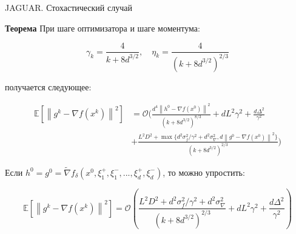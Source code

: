 \documentclass{beamer}
\newcommand{\expect}[1]{\mathbb{E}\left[ #1 \right]}
\newcommand{\norms}[1]{\left\| #1 \right\|}
\begin{document}
\begin{frame}{JAGUAR. Стохастический случай}

    \textbf{Теорема} При шаге оптимизатора и шаге моментума:
            
        $$\gamma_k = \frac{4}{k + 8d^{3/2}}, \quad \eta_k = \frac{4}{(k + 8d^{3/2})^{2/3}}$$
            
        получается следующее:

        \small{
            \begin{equation*}
                \begin{split}
                    \expect{\norms{g^k - \nabla f(x^k)}^2} 
                    &=
                    \mathcal{O} \Bigg( \frac{d^4 \norms{h^0 - \nabla f(x^0)}^2}{(k + 8d^{3/2})^{8/3}} + d L^2 \gamma^2 + \frac{d \Delta^2}{\gamma^2}
                    \\&+
                    \frac{L^2 D^2 + \max\{d^2 \sigma_f^2/ \gamma^2 + d^2 \sigma_{\nabla}^2, d \norms{g^0 - \nabla f(x^0)}^2\}}{(k + 8d^{3/2})^{2/3}}  
                    \Bigg)
                \end{split} 
            \end{equation*}
        }

        Если $h^0 = g^0 = \widetilde{\nabla} f_\delta(x^0, \xi^+_1, \xi^-_1, ..., \xi^+_d, \xi^-_d)$, то можно упростить:
    
        \begin{equation*}
            \expect{\norms{g^k - \nabla f(x^k)}^2} = \mathcal{O} \left(\frac{L^2 D^2 + d^2 \sigma_f^2/ \gamma^2 + d^2 \sigma_{\nabla}^2}{(k + 8d^{3/2})^{2/3}} + d L^2 \gamma^2 + \frac{d \Delta^2}{\gamma^2} \right)
        \end{equation*}
            
\end{frame}

\end{document}
